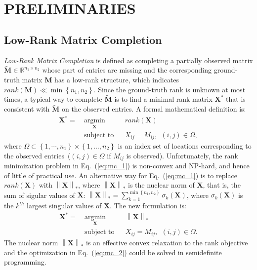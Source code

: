 \section{PRELIMINARIES}

\subsection{Low-Rank Matrix Completion}
\textit{Low-Rank Matrix Completion} is defined as completing a partially observed matrix $\tilde{\mathbf{M}}\in\mathbb{R}^{n_1\times n_2}$ whose part of entries are missing and the corresponding ground-truth matrix $\mathbf{M}$ has a low-rank structure, which indicates $rank(\mathbf{M})\ll \min \left \{ n_1, n_2 \right \}$. Since the ground-truth rank is unknown at most times, a typical way to complete $\tilde{\mathbf{M}}$ is to find a minimal rank matrix $\mathbf{X}^*$ that is consistent with $\tilde{\mathbf{M}}$ on the observed entries. A formal mathematical definition is:
\begin{equation}
    \label{eq:mc_1}
    \begin{aligned}
        \mathbf{X}^* = ~&\underset{\mathbf{X}}{\text{argmin}} 
               &&rank(\mathbf{X})\\
               &\text{subject to}
               && X_{ij} = M_{ij},~~\left ( i, j \right )\in \Omega,
    \end{aligned}
\end{equation}
where $\Omega \subset \left \{ 1, \cdots, n_1 \right \}\times \left \{ 1, \dots, n_2 \right \} $ is an index set of locations corresponding to the observed entries~($\left ( i, j \right )\in \Omega$ if $M_{ij}$ is observed). Unfortunately, the rank minimization problem in Eq.~(\ref{eq:mc_1}) is non-convex and NP-hard, and hence of little of practical use. An alternative way for Eq.~(\ref{eq:mc_1}) is to replace $rank(\mathbf{X})$ with $\left \| \mathbf{X} \right \|_*$, where $\left \| \mathbf{X} \right \|_*$ is the nuclear norm of $\mathbf{X}$, that is, the sum of sigular values of $\mathbf{X}$: $\left \| \mathbf{X} \right \|_* = \sum_{k=1}^{\min \left \{ n_1, n_2 \right \}}\sigma_k(\mathbf{X})$, where $\sigma_k(\mathbf{X})$ is the $k^{th}$ largest singular values of $\mathbf{X}$. The new formulation is:
\begin{equation}
    \label{eq:mc_2}
    \begin{aligned}
        \mathbf{X}^* = ~&\underset{\mathbf{X}}{\text{argmin}} 
               &&\left \| \mathbf{X} \right \|_*\\
               &\text{subject to}
               && X_{ij} = M_{ij},~~\left ( i, j \right )\in \Omega.
    \end{aligned}
\end{equation}
The nuclear norm $\left \| \mathbf{X} \right \|_*$ is an effective convex relaxation to the rank objective and the optimization in Eq.~(\ref{eq:mc_2}) could be solved in semidefinite programming.

